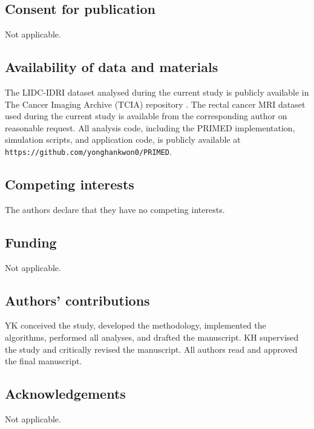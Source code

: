 \documentclass[referee,lineno,pdflatex,sn-vancouver-num]{sn-jnl}
\begin{document}
\subsection*{Consent for publication}
Not applicable.

\subsection*{Availability of data and materials}
The LIDC-IDRI dataset analysed during the current study is publicly available in The Cancer Imaging Archive (TCIA) repository \cite{TCIA2015}. The rectal cancer MRI dataset used during the current study is available from the corresponding author on reasonable request. All analysis code, including the PRIMED implementation, simulation scripts, and application code, is publicly available at \texttt{https://github.com/yonghankwon0/PRIMED}.

\subsection*{Competing interests}
The authors declare that they have no competing interests.

\subsection*{Funding}
Not applicable.

\subsection*{Authors' contributions}
YK conceived the study, developed the methodology, implemented the algorithms, performed all analyses, and drafted the manuscript. KH supervised the study and critically revised the manuscript. All authors read and approved the final manuscript.

\subsection*{Acknowledgements}
Not applicable.
\end{document}
